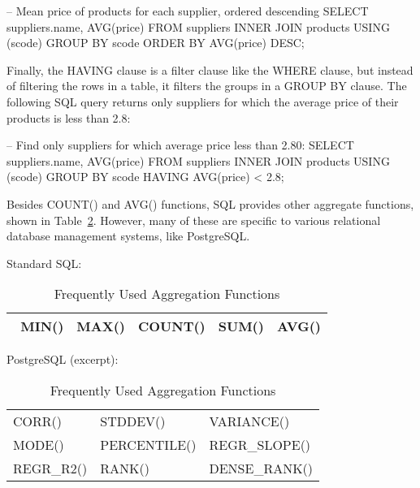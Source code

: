 \begin{samepage}
\begin{sqlcode}
-- Mean price of products for each supplier, ordered descending
SELECT suppliers.name, AVG(price)
    FROM suppliers INNER JOIN products USING (scode)
    GROUP BY scode
    ORDER BY AVG(price) DESC;
\end{sqlcode}
\end{samepage}

Finally, the HAVING clause is a filter clause like the WHERE clause, but instead of filtering the rows in a table, it filters the groups in a GROUP BY clause. The following SQL query returns only suppliers for which the average price of their products is less than 2.8:

\begin{samepage}
\begin{sqlcode}
-- Find only suppliers for which average price less than 2.80:
SELECT suppliers.name, AVG(price)
    FROM suppliers INNER JOIN products USING (scode)
    GROUP BY scode
    HAVING AVG(price) < 2.8;
\end{sqlcode}
\end{samepage}

Besides COUNT() and AVG() functions, SQL provides other aggregate functions, shown in Table~\ref{tab:sqlaggregates}. However, many of these are specific to various relational database management systems, like PostgreSQL. 

\begin{table}
\centering

\renewcommand{\arraystretch}{1.5}
Standard SQL: \\

\small
\begin{tabular}{l|l|l|l|l} \hline
\
MIN() & MAX() & COUNT() & SUM() & AVG() \\ \hline
\end{tabular}

\normalsize

\vspace{\baselineskip}
PostgreSQL (excerpt):\\

\small
\begin{tabular}{l|l|l} \hline
CORR() & STDDEV() & VARIANCE() \\
MODE() & PERCENTILE() & REGR\_SLOPE() \\
REGR\_R2() & RANK() & DENSE\_RANK() \\ \hline
\end{tabular}

\caption{Frequently Used Aggregation Functions}
\label{tab:sqlaggregates}
\end{table}

